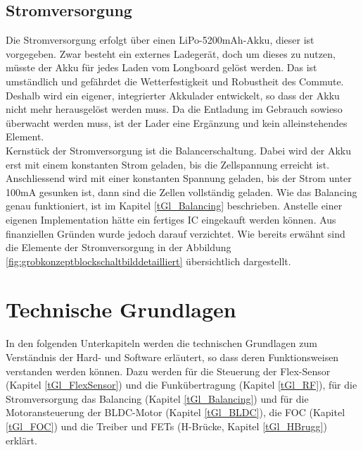 \subsection*{Stromversorgung}
Die Stromversorgung erfolgt über einen LiPo-5200mAh-Akku, dieser ist vorgegeben. Zwar besteht ein externes Ladegerät, doch um dieses zu nutzen, müsste der Akku für jedes Laden vom Longboard gelöst werden. Das ist umständlich und gefährdet die Wetterfestigkeit und Robustheit des Commute. Deshalb wird ein eigener, integrierter Akkulader entwickelt, so dass der Akku nicht mehr herausgelöst werden muss. Da die Entladung im Gebrauch sowieso überwacht werden muss, ist der Lader eine Ergänzung und kein alleinstehendes Element. \\ Kernstück der Stromversorgung ist die Balancerschaltung. Dabei wird der Akku erst mit einem konstanten Strom geladen, bis die Zellspannung erreicht ist. Anschliessend wird mit einer konstanten Spannung geladen, bis der Strom unter 100mA gesunken ist, dann sind die Zellen vollständig geladen. Wie das Balancing genau funktioniert, ist im Kapitel \ref{tGl_Balancing} beschrieben. Anstelle einer eigenen Implementation hätte ein fertiges IC eingekauft werden können. Aus finanziellen Gründen wurde jedoch darauf verzichtet. Wie bereits erwähnt sind die Elemente der Stromversorgung in der Abbildung \ref{fig:grobkonzeptblockschaltbilddetailliert} übersichtlich dargestellt.



\section{Technische Grundlagen}
In den folgenden Unterkapiteln werden die technischen Grundlagen zum Verständnis der Hard- und Software erläutert, so dass deren Funktionsweisen verstanden werden können.  Dazu werden für die Steuerung der Flex-Sensor (Kapitel \ref{tGl_FlexSensor}) und die Funkübertragung (Kapitel \ref{tGl_RF}), für die Stromversorgung das Balancing (Kapitel \ref{tGl_Balancing}) und für die Motoransteuerung der BLDC-Motor (Kapitel \ref{tGl_BLDC}), die FOC (Kapitel \ref{tGl_FOC}) und die Treiber und FETs (H-Brücke, Kapitel \ref{tGl_HBrugg}) erklärt.


